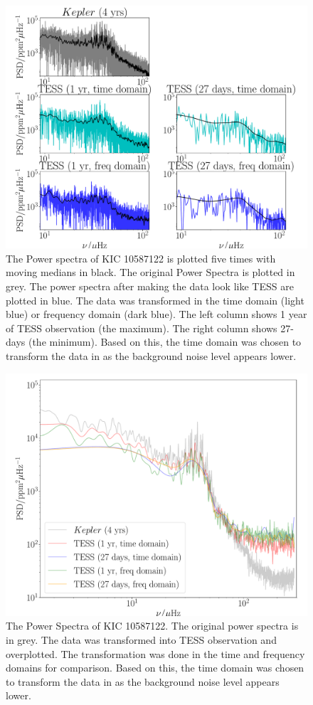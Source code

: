 \documentclass[a4paper,fleqn,usenatbib,useAMS]{mnras}
\begin{document}
\begin{figure}
	\centering
	\includegraphics[scale=0.3]{diagnostic_plot1_modes}
	\caption{The Power spectra of KIC 10587122 is plotted five times with moving medians in black. The original Power Spectra is plotted in grey. The power spectra after making the data look like TESS are plotted in blue. The data was transformed in the time domain (light blue) or frequency domain (dark blue). The left column shows 1 year of TESS observation (the maximum). The right column shows 27-days (the minimum). Based on this, the time domain was chosen to transform the data in as the background noise level appears lower.}	
	\label{Power Spectra}
\end{figure} 
\begin{figure}
	\centering
	\includegraphics[scale=0.3]{diagnostic_plot2_full}
	\caption{The Power Spectra of KIC 10587122. The original power spectra is in grey. The data was transformed into TESS observation and overplotted. The transformation was done in the time and frequency domains for comparison. Based on this, the time domain was chosen to transform the data in as the background noise level appears lower.}	
	\label{overplotted PS}
\end{figure} 
\end{document}
